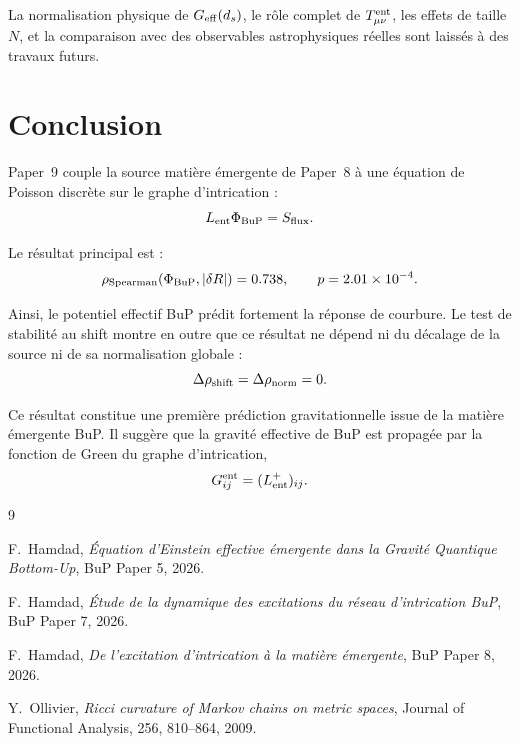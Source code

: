 \documentclass[11pt,a4paper]{article}
\begin{document}
La normalisation physique de \(G_{\rm eff}(d_s)\), le rôle complet de
\(T_{\mu\nu}^{\rm ent}\), les effets de taille \(N\), et la comparaison avec des
observables astrophysiques réelles sont laissés à des travaux futurs.

\section{Conclusion}

Paper~9 couple la source matière émergente de Paper~8 à une équation de Poisson
discrète sur le graphe d'intrication :
\[
L_{\rm ent}\Phi_{\rm BuP}
=
S_{\rm flux}.
\]

Le résultat principal est :
\[
\rho_{\rm Spearman}(\Phi_{\rm BuP},|\delta R|)
=
0.738,
\qquad
p=2.01\times10^{-4}.
\]

Ainsi, le potentiel effectif BuP prédit fortement la réponse de courbure. Le
test de stabilité au shift montre en outre que ce résultat ne dépend ni du
décalage de la source ni de sa normalisation globale :
\[
\Delta\rho_{\rm shift}
=
\Delta\rho_{\rm norm}
=
0.
\]

Ce résultat constitue une première prédiction gravitationnelle issue de la
matière émergente BuP. Il suggère que la gravité effective de BuP est propagée
par la fonction de Green du graphe d'intrication,
\[
G_{ij}^{\rm ent}
=
(L_{\rm ent}^{+})_{ij}.
\]

\begin{thebibliography}{9}

F.~Hamdad,
\textit{Équation d'Einstein effective émergente dans la Gravité Quantique Bottom-Up},
BuP Paper 5, 2026.

F.~Hamdad,
\textit{Étude de la dynamique des excitations du réseau d'intrication BuP},
BuP Paper 7, 2026.

F.~Hamdad,
\textit{De l'excitation d'intrication à la matière émergente},
BuP Paper 8, 2026.

Y.~Ollivier,
\textit{Ricci curvature of Markov chains on metric spaces},
Journal of Functional Analysis, 256, 810--864, 2009.

\end{thebibliography}
\end{document}
